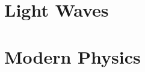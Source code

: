 \documentclass[
  12pt, %
  letterpaper,
]{LegrandOrangeBook}
\begin{document}




\part{Light Waves}










\part{Modern Physics}

%
%



\end{document}
